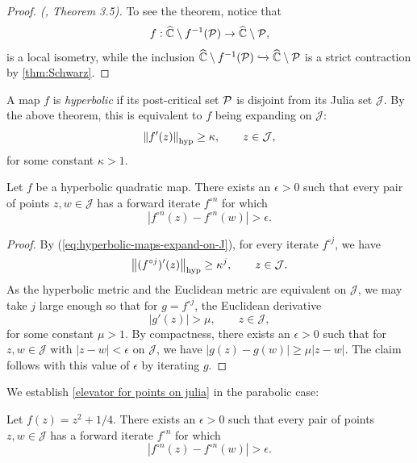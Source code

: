  \begin{proof}[Proof. (\cite{mcmullen_1994}, Theorem 3.5)]
	To see the theorem, notice that
	$$f: \widehat {\mathbb C} \setminus  f^{-1}(\operatorname{\mathcal P}) \to \widehat {\mathbb C} \setminus \operatorname{\mathcal P},
	$$
	is a local isometry, while the  inclusion 
	$\widehat {\mathbb C} \setminus f^{-1}(\operatorname{\mathcal P}) \xhookrightarrow{} 
	\widehat {\mathbb C} \setminus \operatorname{\mathcal P}$ is a strict contraction by  \cref{thm:Schwarz}.
 \end{proof}
	 
A map $f$ is \emph{hyperbolic} if
 its post-critical set $\operatorname{\mathcal P}$ is disjoint from its Julia set $\mathcal J$.
 By the above theorem, this is equivalent to $f$ being expanding on $\mathcal J$:
	\begin{equation}
	\label{eq:hyperbolic-maps-expand-on-J}
		\left\Vert f'(z)\right\Vert_{\operatorname{hyp}} \geq \kappa, \qquad z \in \mathcal J,
	\end{equation} 
 for some constant $\kappa >1$.
 
 \begin{corollary} \label{elevator for points on julia}
	Let $f$ be a hyperbolic quadratic map.
	There exists an $\epsilon > 0$ such that 
	every pair of points $z,w\in\mathcal{J}$
	 has a forward iterate $f^{\circ n}$ for which 
	 \begin{equation*}
		|f^{\circ n}(z)-f^{\circ n}(w)|>\epsilon.	
	 \end{equation*}
\end{corollary}

\begin{proof}	
	By (\ref{eq:hyperbolic-maps-expand-on-J}), for every iterate $f^{\circ j}$, we have
	\begin{equation}
		\left\Vert (f^{\circ j})'(z)\right\Vert_{\operatorname{hyp}} \geq \kappa^j, \qquad z \in \mathcal J.
	\end{equation} 
	As the hyperbolic metric and the Euclidean metric are equivalent on $\mathcal J$,
	we may take $j$ large enough so that for $g=f^{\circ j}$, the Euclidean derivative
	$$|g'(z)| > \mu, \qquad z \in \mathcal J,$$
	 for some constant $\mu  > 1$. 
	By compactness, there exists an $\epsilon>0$ such that for $z, w \in \mathcal J$ with $|z-w| < \epsilon$ on $\mathcal J$,
	we have $|g(z)-g(w)| \geq \mu |z-w|$. The claim follows with this value of $\epsilon$ by iterating $g$.
\end{proof}

We establish \cref{elevator for points on julia} in the parabolic case:
 \begin{corollary} \label{parabolic elevator for points on julia}
	Let $f(z)=z^2+1/4$. 
	There exists an $\epsilon > 0$ such that 
	every pair of points $z,w\in\mathcal{J}$
	 has a forward iterate $f^{\circ n}$ for which 
	 \begin{equation*}
		|f^{\circ n}(z)-f^{\circ n}(w)|>\epsilon.	
	 \end{equation*}
\end{corollary}

